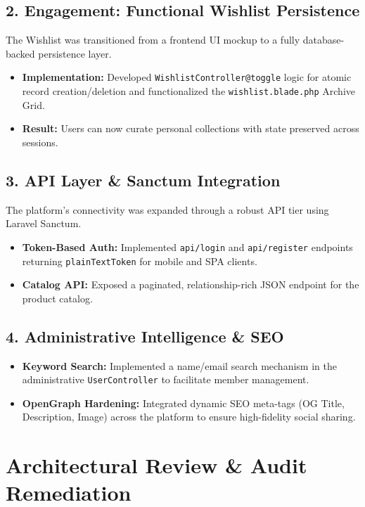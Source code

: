 \documentclass[12pt,a4paper]{article}
\begin{document}
\subsection{2. Engagement: Functional Wishlist Persistence}
The Wishlist was transitioned from a frontend UI mockup to a fully database-backed persistence layer.
\begin{itemize}
    \item \textbf{Implementation:} Developed \texttt{WishlistController@toggle} logic for atomic record creation/deletion and functionalized the \texttt{wishlist.blade.php} Archive Grid.
    \item \textbf{Result:} Users can now curate personal collections with state preserved across sessions.
\end{itemize}

\subsection{3. API Layer \& Sanctum Integration}
The platform's connectivity was expanded through a robust API tier using Laravel Sanctum.
\begin{itemize}
    \item \textbf{Token-Based Auth:} Implemented \texttt{api/login} and \texttt{api/register} endpoints returning \texttt{plainTextToken} for mobile and SPA clients.
    \item \textbf{Catalog API:} Exposed a paginated, relationship-rich JSON endpoint for the product catalog.
\end{itemize}

\subsection{4. Administrative Intelligence \& SEO}
\begin{itemize}
    \item \textbf{Keyword Search:} Implemented a name/email search mechanism in the administrative \texttt{UserController} to facilitate member management.
    \item \textbf{OpenGraph Hardening:} Integrated dynamic SEO meta-tags (OG Title, Description, Image) across the platform to ensure high-fidelity social sharing.
\end{itemize}

\section{Architectural Review \& Audit Remediation}
\end{document}
